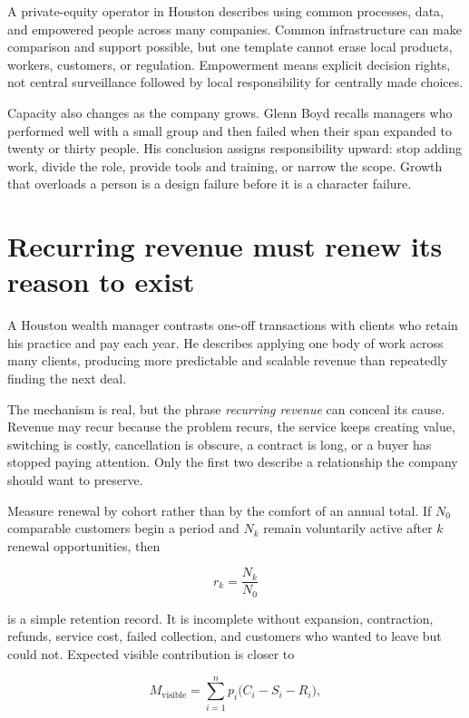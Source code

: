 A private-equity operator in Houston describes using common processes, data,
and empowered people across many companies. Common infrastructure can make
comparison and support possible, but one template cannot erase local products,
workers, customers, or regulation. Empowerment means explicit decision rights,
not central surveillance followed by local responsibility for centrally made
choices.

Capacity also changes as the company grows. Glenn Boyd recalls managers who
performed well with a small group and then failed when their span expanded to
twenty or thirty people. His conclusion assigns responsibility upward: stop
adding work, divide the role, provide tools and training, or narrow the scope.
Growth that overloads a person is a design failure before it is a character
failure.

\section{Recurring revenue must renew its reason to exist}

A Houston wealth manager contrasts one-off transactions with clients who retain
his practice and pay each year. He describes applying one body of work across
many clients, producing more predictable and scalable revenue than repeatedly
finding the next deal.

The mechanism is real, but the phrase \emph{recurring revenue} can conceal its
cause. Revenue may recur because the problem recurs, the service keeps creating
value, switching is costly, cancellation is obscure, a contract is long, or a
buyer has stopped paying attention. Only the first two describe a relationship
the company should want to preserve.

Measure renewal by cohort rather than by the comfort of an annual total. If
\(N_0\) comparable customers begin a period and \(N_k\) remain voluntarily
active after \(k\) renewal opportunities, then

\begin{equation}
r_k=\frac{N_k}{N_0}
\end{equation}

is a simple retention record. It is incomplete without expansion, contraction,
refunds, service cost, failed collection, and customers who wanted to leave but
could not. Expected visible contribution is closer to

\begin{equation}
M_{\mathrm{visible}}
=\sum_{i=1}^{n}p_i\bigl(C_i-S_i-R_i\bigr),
\end{equation}


